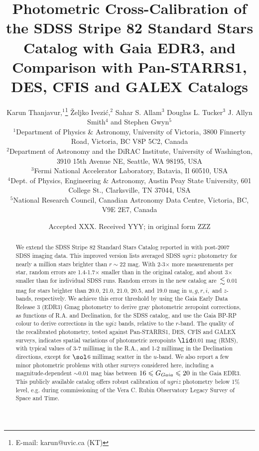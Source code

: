 \documentclass[fleqn,usenatbib]{mnras}
\title[SDSS Stripe 82 Standard Stars Catalog: New and Improved]{Photometric Cross-Calibration
of the SDSS Stripe 82 Standard Stars Catalog with Gaia EDR3, and Comparison with Pan-STARRS1, DES, 
CFIS and GALEX Catalogs}
\author[K. Thanjavur et al.]{
Karun Thanjavur,$^{1}$\thanks{E-mail: karun@uvic.ca (KT)}
\v{Z}eljko Ivezi\'{c},$^{2}$
Sahar S. Allam$^{3}$
Douglas L. Tucker$^{3}$
J. Allyn Smith$^{4}$
and Stephen Gwyn$^{5}$
\\
$^{1}$Department of Physics \& Astronomy, University of Victoria, 3800 Finnerty Road, Victoria, BC V8P 5C2, Canada\\
$^{2}$Department of Astronomy and the DiRAC Institute, University of Washington, 3910 15th Avenue NE, Seattle, WA 98195, USA\\
$^{3}$Fermi National Accelerator Laboratory, Batavia, Il 60510, USA\\
$^{4}$Dept. of Physics, Engineering \& Astronomy, Austin Peay State University, 601 College St., Clarksville, TN 37044, USA\\
$^{5}$National Research Council, Canadian Astronomy Data Centre, Victoria, BC, V9E 2E7, Canada
}
\date{Accepted XXX. Received YYY; in original form ZZZ}
\newcommand{\GG}{\hbox{$G_{Gaia}$}}
\begin{document}
\label{firstpage}
\pagerange{\pageref{firstpage}--\pageref{lastpage}}
\maketitle

\begin{abstract}

\noindent We extend the SDSS Stripe 82 Standard Stars Catalog reported in \citet{Ivez07} with post-2007 SDSS imaging data. This improved version lists averaged SDSS $ugriz$ photometry for nearly a million stars brighter than $r\sim22$ mag. With 2-3$\times$ more measurements per star, random errors are 1.4-1.7$\times$ smaller than in the original catalog, and about 3$\times$ smaller than for individual SDSS runs. Random errors in the new catalog are $\la$0.01 mag for stars brighter than 20.0, 21.0, 21.0, 20.5, and 19.0 mag in $u,g,r,i,$ and $z$-bands, respectively. We achieve this error threshold by using the Gaia Early Data Release 3 (EDR3) Gmag photometry to derive gray photometric zeropoint corrections, as functions of R.A. and Declination, for the SDSS catalog, and use the Gaia BP-RP colour to derive corrections in the $ugiz$ bands, relative to the $r$-band. The quality of the recalibrated photometry, tested against Pan-STARRS1, DES, CFIS and GALEX surveys, indicates spatial variations of photometric zeropoints $\lid$0.01 mag (RMS), with typical values of 3-7 millimag in the R.A., and 1-2 millimag in the Declination directions, except for $\sol$6 millimag scatter in the $u$-band. We also report a few minor photometric problems with other surveys considered here, including a magnitude-dependent $\sim$0.01 mag bias between $16 \leq \GG \leq 20$ in the Gaia EDR3. This publicly available catalog offers robust calibration of $ugriz$ photometry below 1\% level, e.g. during commissioning of the Vera C. Rubin Observatory Legacy Survey of Space and Time.



\end{abstract}
\end{document}
